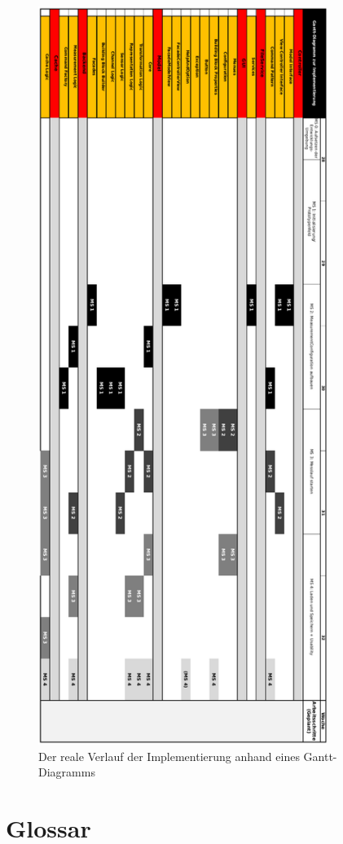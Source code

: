 \documentclass[parskip=full]{scrartcl}
\begin{document}
\begin{figure}[htbp]
    \begin{center}
        \includegraphics[height = 24cm]{Grafiken/Realer_Ablauf_der_Implementierung.pdf}
        \caption{Der reale Verlauf der Implementierung anhand eines Gantt-Diagramms}
        \label{reale}
    \end{center}
\end{figure}

\clearpage
\section{Glossar}\label{glossar}

\renewcommand*{\glossarysection}[2][]{}	%
\printnoidxglossaries				%
\end{document}

